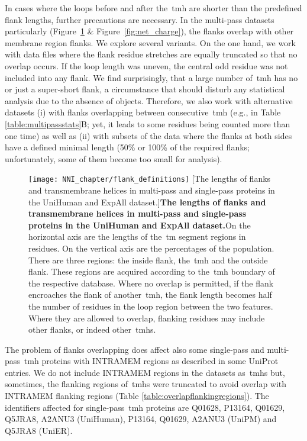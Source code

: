 In cases where the loops before and after the~\gls{tmh} are shorter than the predefined flank lengths, further precautions are necessary.
In the multi\--pass datasets particularly (Figure~\ref{fig:flank_definitions} \& Figure~\ref{fig:net_charge}), the flanks overlap with other membrane region flanks.
We explore several variants.
On the one hand, we work with data files where the flank residue stretches are equally truncated so that no overlap occurs.
If the loop length was uneven, the central odd residue was not included into any flank.
We find surprisingly, that a large number of~\gls{tmh} has no or just a super-short flank, a circumstance that should disturb any statistical analysis due to the absence of objects.
Therefore, we also work with alternative datasets (i) with flanks overlapping between consecutive~\gls{tmh} (e.g., in Table \ref{table:multipassstats}B; yet, it leads to some residues being counted more than one time) as well as (ii) with subsets of the data where the flanks at both sides have a defined minimal length (50\% or 100\% of the required flanks; unfortunately, some of them become too small for analysis).

\begin{figure}[!ht]
\centering
\texttt{[image: NNI\_chapter/flank\_definitions]}
[The lengths of flanks and transmembrane helices in multi\--pass and single\--pass proteins in the UniHuman and ExpAll dataset.]{\textbf{The lengths of flanks and transmembrane helices in multi\--pass and single\--pass proteins in the UniHuman and ExpAll dataset.}On the horizontal axis are the lengths of the~\gls{tm} segment regions in residues.
On the vertical axis are the percentages of the population.
There are three regions: the inside flank, the~\gls{tmh} and the outside flank.
These regions are acquired according to the~\gls{tmh} boundary of the respective database.
Where no overlap is permitted, if the flank encroaches the flank of another~\gls{tmh}, the flank length becomes half the number of residues in the loop region between the two features.
Where they are allowed to overlap, flanking residues may include other flanks, or indeed other~\gls{tmh}s.}

\label{fig:flank_definitions}
\end{figure}

The problem of flanks overlapping does affect also some single\--pass and multi\--pass~\gls{tmh} proteins with INTRAMEM regions as described in some UniProt entries.
We do not include INTRAMEM regions in the datasets as~\gls{tmh}s but, sometimes, the flanking regions of~\gls{tmh}s were truncated to avoid overlap with INTRAMEM flanking regions (Table \ref{table:overlapflankingregions}).
 The identifiers affected for single\--pass~\gls{tmh} proteins are Q01628, P13164, Q01629, Q5JRA8, A2ANU3 (UniHuman), P13164, Q01629, A2ANU3 (UniPM) and Q5JRA8 (UniER).

